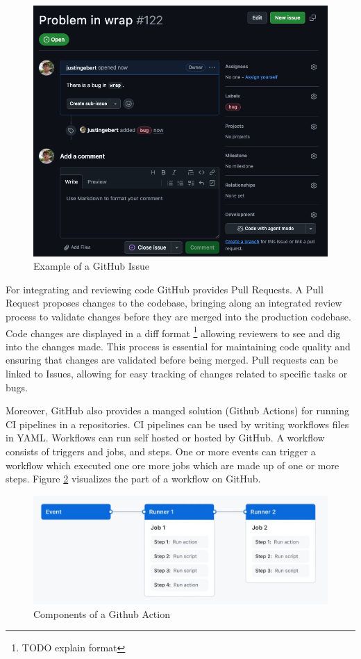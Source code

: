 \begin{figure}[H]
    \centering
    \includegraphics[width=1\textwidth]{images/github/github_issue.png}
    \caption{Example of a GitHub Issue}
    \label{fig:gh-issue}
\end{figure}

For integrating and reviewing code GitHub provides Pull Requests. A Pull Request proposes changes to the codebase, bringing along an integrated review process to validate changes before they are merged into the production codebase. Code changes are displayed in a diff format \footnote{TODO explain format} allowing reviewers to see and dig into the changes made. This process is essential for maintaining code quality and ensuring that changes are validated before being merged. Pull requests can be linked to Issues, allowing for easy tracking of changes related to specific tasks or bugs. \cite{PullRequests}

Moreover, GitHub also provides a manged solution (Github Actions) for running CI pipelines in a repositories. CI pipelines can be used by writing workflows files in YAML. Workflows can run self hosted or hosted by GitHub. A workflow consists of triggers and jobs, and steps. One or more events can trigger a workflow which executed one ore more jobs which are made up of one or more steps. \cite{UnderstandingGitHubActions} Figure \ref{fig:gh-workflow} visualizes the part of a workflow on GitHub.

\begin{figure}[H]
    \centering
    \includegraphics[width=1\textwidth]{images/overview-actions-simple.png}
    \caption{Components of a Github Action}
    \label{fig:gh-workflow}
\end{figure}


